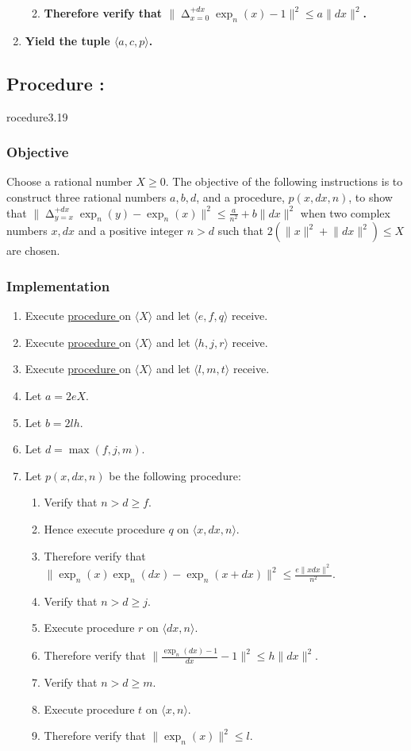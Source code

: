 \documentclass{article}
\DeclareMathOperator*{\diff}{\Delta}
\newcounter{procedure}[part]
\newcommand{\procedure}[1]{\subsection*{Procedure \thepart:\theprocedure}\label{sec:procedure #1}\global\expandafter\edef\csname procedure#1\endcsname{\thepart:\theprocedure}\addtocounter{procedure}{1}}
\newcommand{\objective}{\subsubsection*{Objective}}
\newcommand{\implementation}{\subsubsection*{Implementation}}
\newcommand{\procedurehr}[1]{\hyperref[sec:procedure #1]{procedure \expandafter\csname procedure#1\endcsname}}
\begin{document}
\begin{multicols}{2}
\begin{enumerate}
\begin{enumerate}
\begin{enumerate}
						\end{enumerate}
						\item \textbf{Therefore verify that $\lVert\diff_{x=0}^{+dx}\exp_n(x)-1\rVert^2\le a\lVert dx\rVert^2$.}
					\end{enumerate}
					\item \textbf{Yield the tuple $\langle a,c,p\rangle$.}
				\end{enumerate}
		\procedure{3.19}
			\objective
				Choose a rational number $X\ge 0$. The objective of the following instructions is to construct three rational numbers $a,b,d$, and a procedure, $p(x,dx,n)$, to show that $\lVert\diff_{y=x}^{+dx}\exp_n(y)-\exp_n(x)\rVert^2\le\frac{a}{n^2}+b\lVert dx\rVert^2$ when two complex numbers $x,dx$ and a positive integer $n>d$ such that $2(\lVert x\rVert^2+\lVert dx\rVert^2)\le X$ are chosen. 
			\implementation
				\begin{enumerate}
					\item Execute \procedurehr{3.15} on $\langle X\rangle$ and let $\langle e,f,q\rangle$ receive.
					\item Execute \procedurehr{3.18} on $\langle X\rangle$ and let $\langle h,j,r\rangle$ receive.
					\item Execute \procedurehr{3.13} on $\langle X\rangle$ and let $\langle l,m,t\rangle$ receive.
					\item Let $a=2eX$.
					\item Let $b=2lh$.
					\item Let $d=\max(f,j,m)$.
					\item Let $p(x,dx,n)$ be the following procedure:
					\begin{enumerate}
						\item Verify that $n>d\ge f$.
						\item Hence execute procedure $q$ on $\langle x,dx,n\rangle$.
						\item Therefore verify that $\lVert\exp_n(x)\exp_n(dx)-\exp_n(x+dx)\rVert^2\le\frac{e\lVert xdx\rVert^2}{n^2}$.
						\item Verify that $n>d\ge j$.
						\item Execute procedure $r$ on $\langle dx,n\rangle$.
						\item Therefore verify that $\lVert\frac{\exp_n(dx)-1}{dx}-1\rVert^2\le h\lVert dx\rVert^2$.
						\item Verify that $n>d\ge m$.
						\item Execute procedure $t$ on $\langle x,n\rangle$.
						\item Therefore verify that $\lVert\exp_n(x)\rVert^2\le l$.

\end{enumerate}
\end{enumerate}
\end{multicols}
\end{document}
